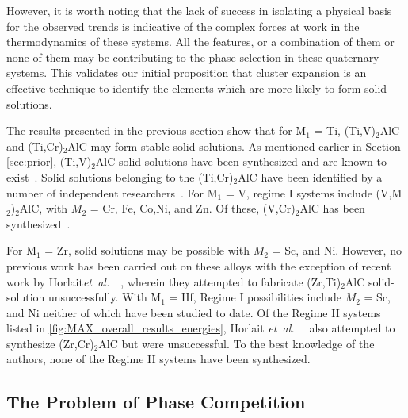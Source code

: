 \documentclass[preprint,amsmath,amssymb,aps, prb,showkeys]{revtex4-1}
\def\etal{\mbox{\it et al.\ }}
\begin{document}
However, it is worth noting that the lack of success in isolating a physical basis for the observed trends is indicative of the complex forces at work in the thermodynamics of these systems. All the features, or a combination of them or none of them may be contributing to the phase-selection in these quaternary systems. This validates our initial proposition that cluster expansion is an effective technique to identify the elements which are more likely to form solid solutions.

The results presented in the previous section show that for M$_1$ = Ti, (Ti,V)$_2$AlC and (Ti,Cr)$_2$AlC may form stable solid solutions. As mentioned earlier in Section \ref{sec:prior}, (Ti,V)$_2$AlC solid solutions have been synthesized and are known to exist~\cite{schuster1980ternary,meng2005strengthening,yeh2014combustion}. Solid solutions belonging to the (Ti,Cr)$_2$AlC have been identified by a number of independent researchers~\cite{schuster1980ternary}. For  M$_1$ = V, regime I systems include (V,M$_2$)$_2$AlC, with $M_2$ = Cr, Fe, Co,Ni, and Zn. Of these, (V,Cr)$_2$AlC has been synthesized~\cite{schuster1980ternary, barsoum2002thermal}. 

For M$_1$ = Zr, solid solutions may be possible with $M_2$ = Sc, and Ni. However, no previous work has been carried out on these alloys with the exception of recent work by Horlait\etal~\cite{horlait2016attempts}, wherein they attempted to fabricate (Zr,Ti)$_2$AlC solid-solution unsuccessfully. With M$_1$ = Hf, Regime I possibilities include $M_2$ = Sc, and 
Ni neither of which have been studied to date. Of the Regime II systems listed in \ref{fig:MAX_overall_results_energies}, Horlait \etal~\cite{horlait2016attempts} also attempted to synthesize (Zr,Cr)$_2$AlC but were unsuccessful. To the best knowledge of the authors, none of the Regime II systems have been synthesized. 


\subsection{The Problem of Phase Competition}
\end{document}
